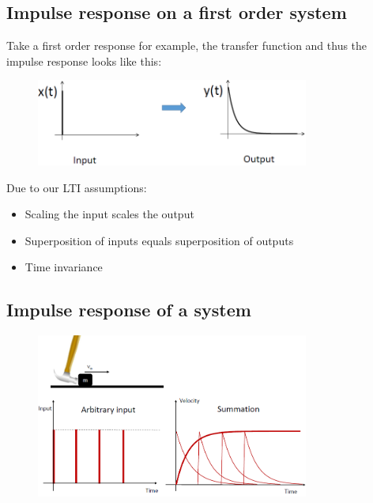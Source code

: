 \documentclass[class=report, crop=false, 12pt,a4paper, tikz, border=4mm]{standalone}
\begin{document}
\subsection{Impulse response on a first order system}
Take a first order response for example, the transfer function and thus the impulse response looks like this:
\begin{figure}[H]
  \centering
  \includegraphics[width = 0.8\textwidth]{../img/diagram24.png}
\end{figure}
Due to our LTI assumptions:
\begin{itemize}
  \item Scaling the input scales the output
  \item Superposition of inputs equals superposition of outputs
  \item Time invariance
\end{itemize}
\subsection{Impulse response of a system}
\begin{figure}[H]
  \centering
  \includegraphics[width = 0.8\textwidth]{../img/diagram25.png}
\end{figure}
\end{document}
